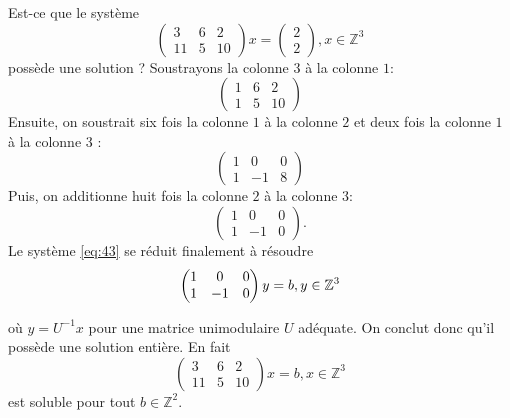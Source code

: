\begin{example}
  \label{exe:28}
  Est-ce que le système
  \begin{equation}
    \label{eq:43}
     \begin{pmatrix}
      3 & 6 & 2 \\
      11 & 5 & 10
    \end{pmatrix} x =
    \begin{pmatrix}
      2 \\ 2
    \end{pmatrix}, x ∈ℤ^3
      \end{equation}
  possède une solution ?
  Soustrayons la colonne $3$ à la colonne $1$:
  \begin{displaymath}
     \begin{pmatrix}
      1 & 6 & 2 \\
      1 & 5 & 10
    \end{pmatrix}
  \end{displaymath}
  Ensuite, on soustrait six fois la colonne $1$ à la colonne $2$ et deux fois la colonne $1$ à la colonne $3$ :
 \begin{displaymath}
     \begin{pmatrix}
      1 & 0 & 0 \\
      1 & -1 & 8
    \end{pmatrix}
  \end{displaymath}
  Puis, on additionne huit fois la colonne $2$ à la colonne $3$:
  \begin{displaymath}
  \begin{pmatrix}
      1 & 0 & 0 \\
      1 & -1 & 0
    \end{pmatrix}. 
  \end{displaymath}      
  Le système \eqref{eq:43} se réduit finalement à résoudre \[   \begin{pmatrix}
      1 & 0 & 0 \\
      1 & -1 & 0
    \end{pmatrix} y = b, y \in \mathbb{Z}^3 \]
  
  où $y = U^{-1}x$ pour une matrice unimodulaire $U$ adéquate.
   On conclut donc qu'il possède une solution entière. En fait
    \begin{displaymath}
     \begin{pmatrix}
      3 & 6 & 2 \\
      11 & 5 & 10
    \end{pmatrix} x =
    b, x ∈ℤ^3
  \end{displaymath} est soluble pour tout $b ∈ℤ^2$.
\end{example}


